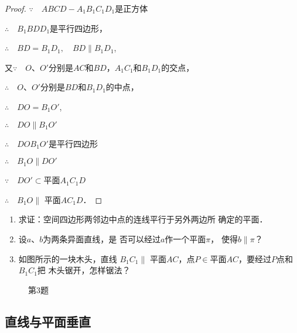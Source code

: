 \begin{proof}  
  $\because\quad ABCD-A_1B_1C_1D_1$是正方体

$\therefore\quad   B_1BDD_1$是平行四边形，

$\therefore\quad BD=B_1D_1,\quad  BD\parallel B_1D_1$,

又$\because\quad O$、$O'$分别是$AC$和$BD$，$A_1C_1$和$B_1D_1$的交点，

$\therefore\quad O$、$O'$分别是$BD$和$B_1D_1$的中点，

$\therefore\quad DO=B_1O'$,

$\therefore\quad   DO\parallel B_1O'$

$\therefore\quad   DOB_1O'$是平行四边形

$\therefore\quad   B_1O\parallel DO'$

$\because\quad DO'\subset$平面$A_1C_1D$

$\therefore\quad  B_1O\parallel$ 平面$AC_1D$．
\end{proof}

\begin{ex}
\begin{enumerate}
  \item 求证：空间四边形两邻边中点的连线平行于另外两边所
  确定的平面．
  \item 设$a$、$b$为两条异面直线，是
  否可以经过$a$作一个平面$\pi$，
  使得$b\parallel \pi$？
  \item 如图所示的一块木头，直线
  $B_1C_1\parallel$ 平面$AC$，点$P\in$平面$AC$，要经过$P$点和$B_1C_1$把
  木头锯开，怎样锯法？
\end{enumerate}
\end{ex}

\begin{figure}[ht]
  \centering
{}
  \caption*{第3题}
\end{figure}

\subsection{直线与平面垂直}

